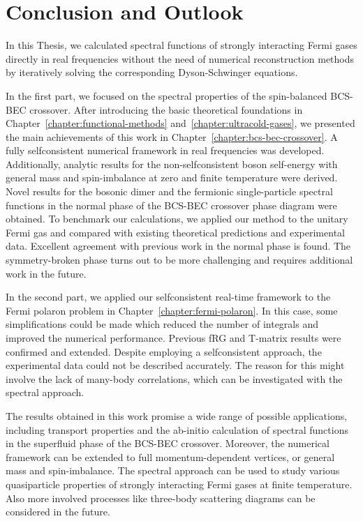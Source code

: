 \chapter{Conclusion and Outlook}
\label{chapter:conclusion}

In this Thesis, we calculated spectral functions of strongly interacting Fermi gases directly in real frequencies without the need of numerical reconstruction methods by iteratively solving the corresponding Dyson-Schwinger equations. 

In the first part, we focused on the spectral properties of the spin-balanced BCS-BEC crossover. After introducing the basic theoretical foundations in Chapter~\ref{chapter:functional-methods} and~\ref{chapter:ultracold-gases}, we presented the main achievements of this work in Chapter~\ref{chapter:bcs-bec-crossover}. A fully selfconsistent numerical framework in real frequencies was developed. Additionally, analytic results for the non-selfconsistent boson self-energy with general mass and spin-imbalance at zero and finite temperature were derived. Novel results for the bosonic dimer and the fermionic single-particle spectral functions in the normal phase of the BCS-BEC crossover phase diagram were obtained. To benchmark our calculations, we applied our method to the unitary Fermi gas and compared with existing theoretical predictions and experimental data. Excellent agreement with previous work in the normal phase is found. The symmetry-broken phase turns out to be more challenging and requires additional work in the future.

In the second part, we applied our selfconsistent real-time framework to the Fermi polaron problem in Chapter~\ref{chapter:fermi-polaron}. In this case, some simplifications could be made which reduced the number of integrals and improved the numerical performance. Previous fRG and T-matrix results were confirmed and extended. Despite employing a selfconsistent approach, the experimental data could not be described accurately. The reason for this might involve the lack of many-body correlations, which can be investigated with the spectral approach.

The results obtained in this work promise a wide range of possible applications, including transport properties and the ab-initio calculation of spectral functions in the superfluid phase of the BCS-BEC crossover. Moreover, the numerical framework can be extended to full momentum-dependent vertices, or general mass and spin-imbalance. The spectral approach can be used to study various quasiparticle properties of strongly interacting Fermi gases at finite temperature. Also more involved processes like three-body scattering diagrams can be considered in the future.

\cleardoublepage